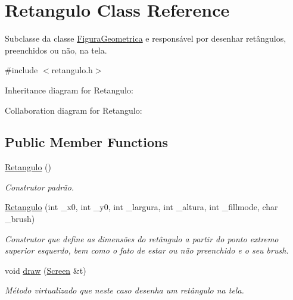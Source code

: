 \hypertarget{class_retangulo}{}\section{Retangulo Class Reference}
\label{class_retangulo}


Subclasse da classe \hyperlink{class_figura_geometrica}{Figura\+Geometrica} e responsável por desenhar retângulos, preenchidos ou não, na tela.  




{\ttfamily \#include $<$retangulo.\+h$>$}



Inheritance diagram for Retangulo\+:


Collaboration diagram for Retangulo\+:
\subsection*{Public Member Functions}
\begin{DoxyCompactItemize}
\item 
\mbox{\label{class_retangulo_ac21a81cae046920c8bee401bcb879562}} 
\hyperlink{class_retangulo_ac21a81cae046920c8bee401bcb879562}{Retangulo} ()
\begin{DoxyCompactList}\small\item\em Construtor padrão. \end{DoxyCompactList}\item 
\mbox{\label{class_retangulo_a2ee865ca0e1334b82eca44ee96c9b0c0}} 
\hyperlink{class_retangulo_a2ee865ca0e1334b82eca44ee96c9b0c0}{Retangulo} (int \+\_\+x0, int \+\_\+y0, int \+\_\+largura, int \+\_\+altura, int \+\_\+fillmode, char \+\_\+brush)
\begin{DoxyCompactList}\small\item\em Construtor que define as dimensões do retângulo a partir do ponto extremo superior esquerdo, bem como o fato de estar ou não preenchido e o seu brush. \end{DoxyCompactList}\item 
\mbox{\label{class_retangulo_ac088dd6d3f4f3d3f80363a868c2e74f1}} 
void \hyperlink{class_retangulo_ac088dd6d3f4f3d3f80363a868c2e74f1}{draw} (\hyperlink{class_screen}{Screen} \&t)
\begin{DoxyCompactList}\small\item\em Método virtualizado que neste caso desenha um retângulo na tela. \end{DoxyCompactList}\end{DoxyCompactItemize}
